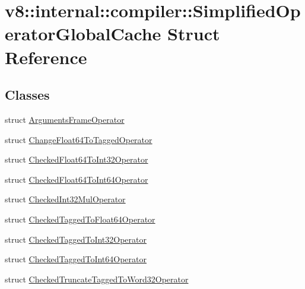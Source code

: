 \hypertarget{structv8_1_1internal_1_1compiler_1_1SimplifiedOperatorGlobalCache}{}\section{v8\+:\+:internal\+:\+:compiler\+:\+:Simplified\+Operator\+Global\+Cache Struct Reference}
\label{structv8_1_1internal_1_1compiler_1_1SimplifiedOperatorGlobalCache}
\subsection*{Classes}
\begin{DoxyCompactItemize}
\item 
struct \mbox{\hyperlink{structv8_1_1internal_1_1compiler_1_1SimplifiedOperatorGlobalCache_1_1ArgumentsFrameOperator}{Arguments\+Frame\+Operator}}
\item 
struct \mbox{\hyperlink{structv8_1_1internal_1_1compiler_1_1SimplifiedOperatorGlobalCache_1_1ChangeFloat64ToTaggedOperator}{Change\+Float64\+To\+Tagged\+Operator}}
\item 
struct \mbox{\hyperlink{structv8_1_1internal_1_1compiler_1_1SimplifiedOperatorGlobalCache_1_1CheckedFloat64ToInt32Operator}{Checked\+Float64\+To\+Int32\+Operator}}
\item 
struct \mbox{\hyperlink{structv8_1_1internal_1_1compiler_1_1SimplifiedOperatorGlobalCache_1_1CheckedFloat64ToInt64Operator}{Checked\+Float64\+To\+Int64\+Operator}}
\item 
struct \mbox{\hyperlink{structv8_1_1internal_1_1compiler_1_1SimplifiedOperatorGlobalCache_1_1CheckedInt32MulOperator}{Checked\+Int32\+Mul\+Operator}}
\item 
struct \mbox{\hyperlink{structv8_1_1internal_1_1compiler_1_1SimplifiedOperatorGlobalCache_1_1CheckedTaggedToFloat64Operator}{Checked\+Tagged\+To\+Float64\+Operator}}
\item 
struct \mbox{\hyperlink{structv8_1_1internal_1_1compiler_1_1SimplifiedOperatorGlobalCache_1_1CheckedTaggedToInt32Operator}{Checked\+Tagged\+To\+Int32\+Operator}}
\item 
struct \mbox{\hyperlink{structv8_1_1internal_1_1compiler_1_1SimplifiedOperatorGlobalCache_1_1CheckedTaggedToInt64Operator}{Checked\+Tagged\+To\+Int64\+Operator}}
\item 
struct \mbox{\hyperlink{structv8_1_1internal_1_1compiler_1_1SimplifiedOperatorGlobalCache_1_1CheckedTruncateTaggedToWord32Operator}{Checked\+Truncate\+Tagged\+To\+Word32\+Operator}}

\end{DoxyCompactItemize}

